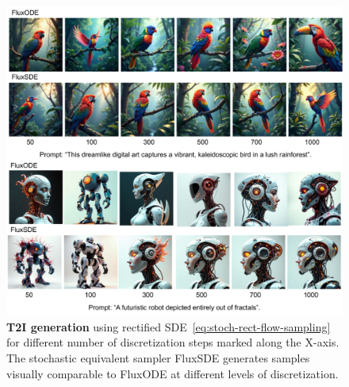 \documentclass{article} %
\theoremstyle{plain}
\begin{document}
\begin{figure}[!tbh]
\includegraphics[width=\linewidth]{pics/stoch-rect-flow-swampling_low.pdf}
\caption{\textbf{T2I generation}
using rectified SDE~\eqref{eq:stoch-rect-flow-sampling} for different number of discretization steps marked along the X-axis. The stochastic equivalent sampler FluxSDE generates samples visually comparable to FluxODE at different levels of discretization.
}
\label{fig:appl-resde}
\end{figure}




\end{document}
